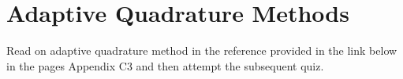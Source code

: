 \section{Adaptive Quadrature Methods}
\activities
Read on adaptive quadrature method in the reference provided in the link below in the pages Appendix C3 and then attempt the subsequent quiz.
\begin{activity}[\cg Reading]
\end{activity}
